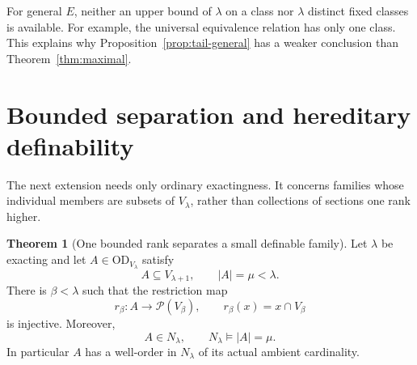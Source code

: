 \documentclass[11pt,letterpaper]{article}
\theoremstyle{definition}
\newtheorem{theorem}[definition]{Theorem}
\numberwithin{equation}{section}
\newcommand{\OD}{\mathrm{OD}}
\newcommand{\Pow}{\mathcal P}
\newcommand{\Nlam}{N_\lambda}
\begin{document}
For general $E$, neither an upper bound of $\lambda$ on a class nor $\lambda$ distinct fixed classes is available. For example, the universal equivalence relation has only one class. This explains why Proposition~\ref{prop:tail-general} has a weaker conclusion than Theorem~\ref{thm:maximal}.

\section{Bounded separation and hereditary definability}\label{sec:separation}

The next extension needs only ordinary exactingness. It concerns families whose individual members are subsets of $V_\lambda$, rather than collections of sections one rank higher.

\begin{samepage}
\begin{theorem}[One bounded rank separates a small definable family]\label{thm:separation}
Let $\lambda$ be exacting and let $A\in\OD_{V_\lambda}$ satisfy
\[
A\subseteq V_{\lambda+1},\qquad |A|=\mu<\lambda.
\]
There is $\beta<\lambda$ such that the restriction map
\[
r_\beta:A\longrightarrow\Pow(V_\beta),\qquad
r_\beta(x)=x\cap V_\beta
\]
is injective. Moreover,
\[
A\in\Nlam,
\qquad
\Nlam\models |A|=\mu.
\]
In particular $A$ has a well-order in $\Nlam$ of its actual ambient cardinality.
\end{theorem}
\end{samepage}
\end{document}
